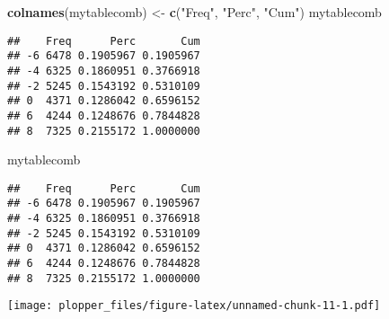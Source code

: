 \documentclass[]{article}
\newenvironment{Shaded}{\begin{snugshade}}{\end{snugshade}}
\newcommand{\KeywordTok}[1]{\textcolor[rgb]{0.13,0.29,0.53}{\textbf{#1}}}
\newcommand{\DataTypeTok}[1]{\textcolor[rgb]{0.13,0.29,0.53}{#1}}
\newcommand{\DecValTok}[1]{\textcolor[rgb]{0.00,0.00,0.81}{#1}}
\newcommand{\StringTok}[1]{\textcolor[rgb]{0.31,0.60,0.02}{#1}}
\newcommand{\OperatorTok}[1]{\textcolor[rgb]{0.81,0.36,0.00}{\textbf{#1}}}
\newcommand{\NormalTok}[1]{#1}
\begin{document}
\begin{Shaded}
\begin{Highlighting}[]
\KeywordTok{colnames}\NormalTok{(mytablecomb) <-}\StringTok{ }\KeywordTok{c}\NormalTok{(}\StringTok{"Freq"}\NormalTok{, }\StringTok{"Perc"}\NormalTok{, }\StringTok{"Cum"}\NormalTok{)}
\NormalTok{mytablecomb}
\end{Highlighting}
\end{Shaded}

\begin{verbatim}
##    Freq      Perc       Cum
## -6 6478 0.1905967 0.1905967
## -4 6325 0.1860951 0.3766918
## -2 5245 0.1543192 0.5310109
## 0  4371 0.1286042 0.6596152
## 6  4244 0.1248676 0.7844828
## 8  7325 0.2155172 1.0000000
\end{verbatim}

\begin{Shaded}
\begin{Highlighting}[]
\NormalTok{mytablecomb}
\end{Highlighting}
\end{Shaded}

\begin{verbatim}
##    Freq      Perc       Cum
## -6 6478 0.1905967 0.1905967
## -4 6325 0.1860951 0.3766918
## -2 5245 0.1543192 0.5310109
## 0  4371 0.1286042 0.6596152
## 6  4244 0.1248676 0.7844828
## 8  7325 0.2155172 1.0000000
\end{verbatim}

\begin{Shaded}
\end{Shaded}

\texttt{[image: plopper\_files/figure-latex/unnamed-chunk-11-1.pdf]}
\end{document}
